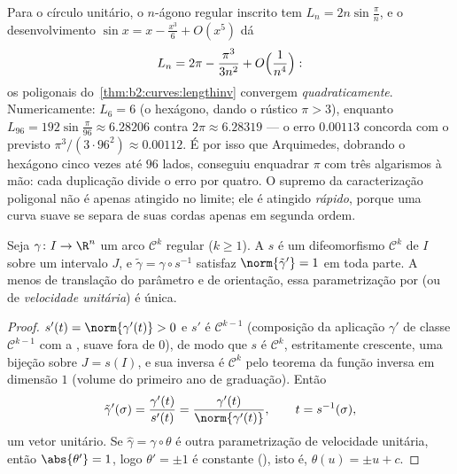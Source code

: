 \begin{example}\label{ex:b2:curves:archimedes}
Para o círculo unitário, o $n$-ágono regular inscrito tem 
$L_n = 2n\sin\frac\pi n$, e o desenvolvimento $\sin x = x -
\frac{x^3}6 + O(x^5)$ dá
\[
L_n = 2\pi - \frac{\pi^3}{3n^2} + O\Bigl(\frac1{n^4}\Bigr) :
\]
os  poligonais do~\cref{thm:b2:curves:lengthinv}
convergem \emph{quadraticamente}. Numericamente: $L_6 = 6$
(o hexágono, dando o rústico $\pi > 3$), enquanto $L_{96} =
192\sin\frac{\pi}{96} \approx 6.28206$ contra $2\pi \approx
6.28319$ --- o erro $0.00113$ concorda com o previsto
$\pi^3/(3\cdot96^2) \approx 0.00112$. É por isso que Arquimedes,
dobrando o hexágono cinco vezes até $96$ lados, conseguiu enquadrar
$\pi$ com três algarismos à mão: cada duplicação divide o
erro por quatro. O supremo da caracterização
poligonal não é apenas atingido no limite; ele é
atingido \emph{rápido}, porque uma curva suave se separa de
suas cordas apenas em segunda ordem.
\end{example}

\begin{theorem}\label{thm:b2:curves:arclength}
Seja $\gamma \colon I \to \R^n$ um arco $\mathcal{C}^k$ regular
($k \geq 1$). A  $s$ é um difeomorfismo
$\mathcal{C}^k$ de $I$ sobre um intervalo $J$, e $\tilde\gamma =
\gamma \circ s^{-1}$ satisfaz $\norm{\tilde\gamma'} = 1$
em toda parte. A menos de translação do parâmetro e de orientação,
essa parametrização por \emph{} (ou de \emph{velocidade unitária}) é
única.
\end{theorem}

\begin{proof}
$s'(t) = \norm{\gamma'(t)} > 0$ e $s'$ é $\mathcal{C}^{k-1}$
(composição da aplicação $\gamma'$ de classe $\mathcal{C}^{k-1}$ com a ,
suave fora de $0$), de modo que $s$ é $\mathcal{C}^k$, estritamente
crescente, uma bijeção sobre $J = s(I)$, e sua inversa é
$\mathcal{C}^k$ pelo teorema da função inversa em dimensão $1$
(volume do primeiro ano de graduação). Então
\[
\tilde\gamma'(\sigma)
= \frac{\gamma'(t)}{s'(t)}
= \frac{\gamma'(t)}{\norm{\gamma'(t)}},
\qquad t = s^{-1}(\sigma),
\]
um vetor unitário. Se $\hat\gamma = \gamma\circ\theta$ é outra
parametrização de velocidade unitária, então $\abs{\theta'} = 1$, logo $\theta'
= \pm 1$ é constante (), isto é, $\theta(u) = \pm u + c$.
\end{proof}

